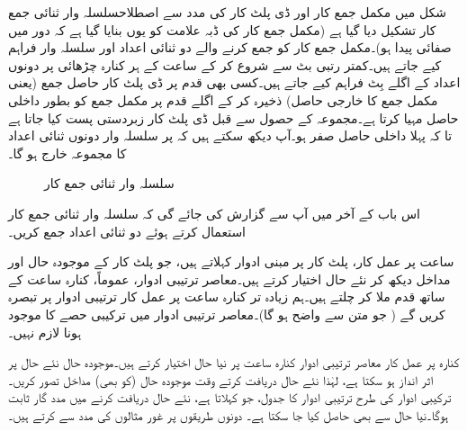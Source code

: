 شکل  میں مکمل جمع کار  اور ڈی پلٹ کار  کی مدد سے اصطلاح{سلسلہ وار ثنائی جمع کار} تشکیل دیا گیا ہے (مکمل جمع کار کی ڈبہ علامت کو یوں بنایا گیا ہے کہ دور میں صفائی پیدا ہو)۔مکمل جمع کار کو جمع کرنے والے دو ثنائی اعداد  اور  سلسلہ وار فراہم کیے جاتے ہیں۔کمتر رتبی بٹ سے شروع کر کے ساعت کے ہر کنارہ چڑھائی پر دونوں اعداد کے اگلے بِٹ فراہم کیے جاتے ہیں۔کسی بھی قدم پر ڈی پلٹ کار حاصل جمع (یعنی مکمل جمع کا خارجی حاصل) ذخیرہ کر کے اگلے قدم پر مکمل جمع کو بطور داخلی حاصل مہیا کرتا ہے۔مجموعہ کے حصول سے قبل ڈی پلٹ کار زبردستی پست کیا جاتا ہے تا کہ پہلا داخلی حاصل صفر ہو۔آپ دیکھ سکتے ہیں کہ  پر سلسلہ وار دونوں ثنائی اعداد کا مجموعہ خارج ہو گا۔ 
\begin{figure}
\centering
{}
\caption{سلسلہ وار ثنائی جمع کار}
\label{شکل_ترتیبی_ثنائی_سلسلہ_وار_جمع_کار}
\end{figure}

اس باب کے آخر میں آپ سے گزارش کی جائے گی کہ سلسلہ وار ثنائی جمع کار استعمال کرتے ہوئے دو ثنائی اعداد جمع کریں۔

ساعت پر عمل کار، پلٹ کار پر مبنی ادوار  کہلاتے ہیں، جو پلٹ کار کے موجودہ حال اور مداخل دیکھ کر نئے حال اختیار کرتے ہیں۔معاصر ترتیبی ادوار، عموماً، کنارہ ساعت کے ساتھ قدم ملا کر چلتے ہیں۔ہم زیادہ تر کنارہ ساعت پر عمل کار ترتیبی ادوار پر تبصرہ کریں گے ( جو متن سے واضح ہو گا)۔معاصر ترتیبی ادوار میں ترکیبی حصے کا موجود ہونا لازم نہیں۔

کنارہ پر عمل کار معاصر ترتیبی ادوار کنارہ ساعت پر نیا حال اختیار کرتے ہیں۔موجودہ حال نئے حال پر اثر انداز ہو سکتا ہے، لہٰذا نئے حال دریافت کرتے وقت موجودہ حال (کو بھی) مداخل تصور کریں۔ترکیبی ادوار کی طرح ترتیبی ادوار کا جدول، جو  کہلاتا ہے، نئے حال دریافت کرنے میں مدد گار ثابت ہوگا۔نیا حال  سے بھی حاصل کیا جا سکتا ہے۔ دونوں طریقوں پر غور مثالوں کی مدد سے کرتے ہیں۔

